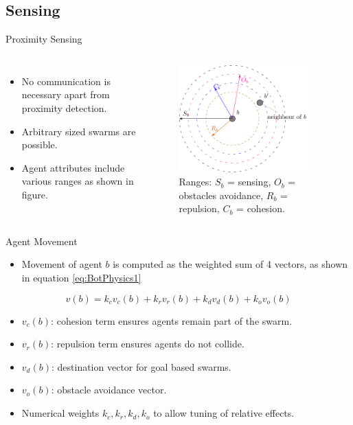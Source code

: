 \documentclass{beamer}
\begin{document}
\subsection{Sensing}

\begin{frame}{Proximity Sensing}
  \begin{columns}
    \begin{itemize}
      \item {
        No communication is necessary apart from proximity detection.
      }
      \item {   
        Arbitrary sized swarms are possible.
      }
      \item {   
        Agent attributes include various ranges as shown in figure.
      }
    \end{itemize}
      \begin{figure}
        \begin{center}
        \includegraphics[width=5cm]{Proximity.pdf}
        \end{center}
        \caption{Ranges: $S_b$ = sensing, $O_b$ = obstacles avoidance, $R_b$ = repulsion, $C_b$ = cohesion.}
      \end{figure}
  \end{columns} 
\end{frame}

\begin{frame}{Agent Movement}
  \begin{itemize}
    \item Movement of agent $b$ is computed as the weighted sum of 4 vectors, as shown in equation \ref{eq:BotPhysics1}
  \end{itemize}
  \begin{equation}\label{eq:BotPhysics1}
    v(b) = k_cv_c(b) + k_rv_r(b) + k_dv_d(b) + k_ov_o(b)
  \end{equation}
  \begin{itemize}
    \item $v_c(b)$: cohesion term ensures agents remain part of the swarm.
    \item $v_r(b)$: repulsion term ensures agents do not collide.
    \item $v_d(b)$: destination vector for goal based swarms.
    \item $v_o(b)$: obstacle avoidance vector.
    \item Numerical weights $k_c, k_r, k_d, k_o$ to allow tuning of relative effects. 
  \end{itemize}
  
\end{frame}
\end{document}
